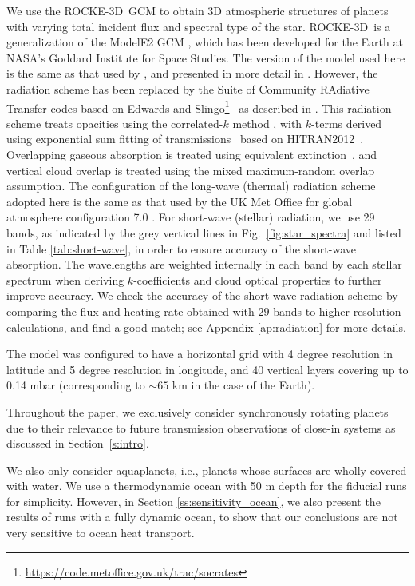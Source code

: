 \documentclass[11pt,numberedappendix,twocolappendix,]{emulateapj}
\def\modelE{ROCKE-3D}
\newcommand{\yf}[1]{{\color{orange}#1}}
\begin{document}
We use the \modelE \ GCM \citep{Way2017} to obtain 3D atmospheric \yf{structures} of planets with varying \yf{total incident flux and spectral type of the star}. 
\modelE \ is a generalization of the ModelE2 GCM \citep{Schmidt2014}, which has been developed for the Earth at NASA's Goddard Institute for Space Studies. 
%
The version of the model used here is the same as that used by \citet{Way2016}, and presented in more detail in \citet{Way2017}.
However, the radiation scheme has been replaced by the Suite of Community RAdiative Transfer codes based on Edwards and Slingo\footnote{\url{https://code.metoffice.gov.uk/trac/socrates}}~\citep[SOCRATES,][]{EdwardsSlingo1996,Edwards1996} as described in \citet{Way2017}. 
This radiation scheme treats opacities using the correlated-$k$ method \citep{Lacis1991,Goody1989}, with $k$-terms derived using exponential sum fitting of transmissions~\citep{Wiscombe1977} based on HITRAN2012~\citep{Rothman2013}.
Overlapping gaseous absorption is treated using equivalent extinction~\citep{Edwards1996,Amundsen2016}, and vertical cloud overlap is treated using the mixed maximum-random overlap assumption.
The configuration of the long-wave (thermal) radiation scheme adopted here is the same as that used by the UK Met Office for global atmosphere configuration 7.0 \citep[GA7.0;][]{Walters2017}. 
For short-wave (stellar) radiation, we use 29 bands, as indicated by the grey vertical lines in Fig.~\ref{fig:star_spectra} and listed in Table \ref{tab:short-wave}, in order to ensure accuracy of the short-wave absorption. 
The wavelengths are weighted internally in each band by each stellar spectrum when deriving $k$-coefficients and cloud optical properties to further improve accuracy. 
We check the accuracy of the short-wave radiation scheme by comparing the flux and heating rate obtained with $29$ bands to higher-resolution calculations, and find a good match; see Appendix \ref{ap:radiation} for more details. 

The model was configured to have a horizontal grid with 4 degree resolution in latitude and 5 degree resolution in longitude, and 40 vertical layers covering up to 0.14 mbar (corresponding to $\sim 65$ km in the case of the Earth). 

Throughout the paper, we exclusively consider synchronously rotating planets due to their relevance to future transmission observations of close-in systems as discussed in Section~\ref{s:intro}. 

We also only consider aquaplanets, i.e., planets whose surfaces are wholly covered with water. 
We use a thermodynamic ocean with 50 m depth for the fiducial runs for simplicity. 
However, in Section \ref{ss:sensitivity_ocean}, we also present the results of runs with a fully dynamic ocean, to show that our conclusions are not very sensitive to ocean heat transport. 
\end{document}
